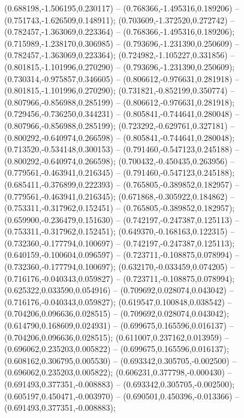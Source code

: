  (0.688198,-1.506195,0.230117) -- (0.768366,-1.495316,0.189206) -- (0.751743,-1.626509,0.148911);
 (0.703609,-1.372520,0.272742) -- (0.782457,-1.363069,0.223364) -- (0.768366,-1.495316,0.189206);
 (0.715989,-1.238170,0.306985) -- (0.793696,-1.231390,0.250609) -- (0.782457,-1.363069,0.223364);
 (0.724982,-1.105227,0.331856) -- (0.801815,-1.101996,0.270290) -- (0.793696,-1.231390,0.250609);
 (0.730314,-0.975857,0.346605) -- (0.806612,-0.976631,0.281918) -- (0.801815,-1.101996,0.270290);
 (0.731821,-0.852199,0.350774) -- (0.807966,-0.856988,0.285199) -- (0.806612,-0.976631,0.281918);
 (0.729456,-0.736250,0.344231) -- (0.805841,-0.744641,0.280048) -- (0.807966,-0.856988,0.285199);
 (0.723292,-0.629761,0.327181) -- (0.800292,-0.640974,0.266598) -- (0.805841,-0.744641,0.280048);
 (0.713520,-0.534148,0.300153) -- (0.791460,-0.547123,0.245188) -- (0.800292,-0.640974,0.266598);
 (0.700432,-0.450435,0.263956) -- (0.779561,-0.463941,0.216345) -- (0.791460,-0.547123,0.245188);
 (0.685411,-0.376899,0.222393) -- (0.765805,-0.389852,0.182957) -- (0.779561,-0.463941,0.216345);
 (0.671868,-0.305922,0.184862) -- (0.753311,-0.317962,0.152451) -- (0.765805,-0.389852,0.182957);
 (0.659900,-0.236479,0.151630) -- (0.742197,-0.247387,0.125113) -- (0.753311,-0.317962,0.152451);
 (0.649370,-0.168163,0.122315) -- (0.732360,-0.177794,0.100697) -- (0.742197,-0.247387,0.125113);
 (0.640159,-0.100604,0.096597) -- (0.723711,-0.108875,0.078994) -- (0.732360,-0.177794,0.100697);
 (0.632170,-0.033459,0.074205) -- (0.716176,-0.040343,0.059827) -- (0.723711,-0.108875,0.078994);
 (0.625322,0.033590,0.054916) -- (0.709692,0.028074,0.043042) -- (0.716176,-0.040343,0.059827);
 (0.619547,0.100848,0.038542) -- (0.704206,0.096636,0.028515) -- (0.709692,0.028074,0.043042);
 (0.614790,0.168609,0.024931) -- (0.699675,0.165596,0.016137) -- (0.704206,0.096636,0.028515);
 (0.611007,0.237162,0.013959) -- (0.696062,0.235203,0.005822) -- (0.699675,0.165596,0.016137);
 (0.608162,0.306795,0.005530) -- (0.693342,0.305705,-0.002500) -- (0.696062,0.235203,0.005822);
 (0.606231,0.377798,-0.000430) -- (0.691493,0.377351,-0.008883) -- (0.693342,0.305705,-0.002500);
 (0.605197,0.450471,-0.003970) -- (0.690501,0.450396,-0.013366) -- (0.691493,0.377351,-0.008883);
